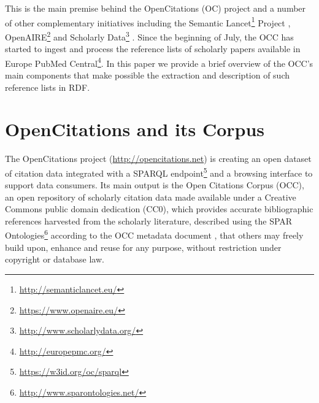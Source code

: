 \documentclass[runningheads,a4paper]{llncs}
\begin{document}
This is the main premise behind the OpenCitations (OC) project and a number of other complementary initiatives including the Semantic Lancet\footnote{\url{http://semanticlancet.eu/}} Project  \cite{__RefNumPara__69_1852566440}, OpenAIRE\footnote{\url{https://www.openaire.eu/}} \cite{__RefNumPara__71_1852566440} and Scholarly Data\footnote{\url{http://www.scholarlydata.org/}} \cite{__RefNumPara__75_1852566440}. Since the beginning of July, the OCC has started to ingest and process the reference lists of scholarly papers available in Europe PubMed Central\footnote{\url{http://europepmc.org/}}. In this paper we provide a brief overview of the OCC's main components that make possible the extraction and description of such reference lists in RDF.

\section{OpenCitations and its Corpus}

The OpenCitations project (\url{http://opencitations.net}) is creating an open dataset of citation data integrated with a SPARQL endpoint\footnote{\url{https://w3id.org/oc/sparql}} and a browsing interface to support data consumers. Its main output is the Open Citations Corpus (OCC), an open repository of scholarly citation data made available under a Creative Commons public domain dedication (CC0), which provides accurate bibliographic references harvested from the scholarly literature, described using the SPAR Ontologies\footnote{\url{http://www.sparontologies.net/}} \cite{__RefNumPara__17_1852566440} according to the OCC metadata document  \cite{__RefNumPara__19_1852566440}, that others may freely build upon, enhance and reuse for any purpose, without restriction under copyright or database law.
\end{document}
